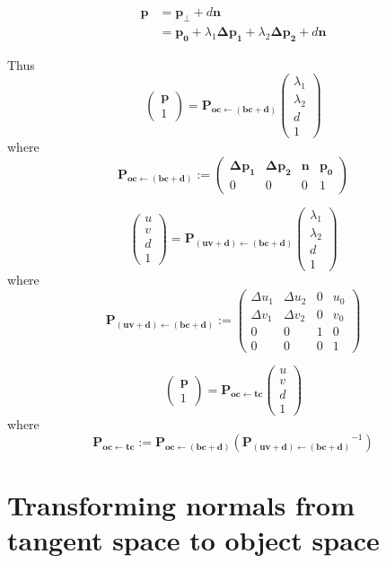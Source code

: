 \documentclass{article}
\newcommand{\vctr}[1]{\mathbf{#1}}
\newcommand{\point}[1]{\mathbf{#1}}
\newcommand{\mat}[1]{\mathbf{#1}}
\newcommand{\pMat}[2]{\mat{P_{#1 \leftarrow #2}}}
\newcommand{\colvec}[1]{\begin{pmatrix}#1\end{pmatrix}}
\begin{document}
\begin{align*}
 \point{p} &= \point{p_\perp} + d \vctr{n}\\
 &= \point{p_0} + \lambda_1 \point{\Delta p_1} + \lambda_2 \point{\Delta p_2} + d \vctr{n}
\end{align*}

Thus
\[
 \colvec{\point{p}\\1} = \pMat{oc}{(bc+d)} \colvec{\lambda_1 \\ \lambda_2 \\ d \\ 1}
\]
where
\begin{equation}
\label{eq:mat_oc_from_bdc}
 \pMat{oc}{(bc+d)} := \begin{pmatrix} 
                  \point{\Delta p_1} & \point{\Delta p_2} & \vctr{n} & \point{p_0} \\
                  0 & 0 & 0 & 1
                 \end{pmatrix}
\end{equation}

\[
 \colvec{u \\ v \\ d \\1} = \pMat{(uv+d)}{(bc+d)} \colvec{\lambda_1 \\ \lambda_2 \\ d \\ 1}
\]
where
\begin{equation}
 \pMat{(uv+d)}{(bc+d)} := \begin{pmatrix} 
                  \Delta u_1 & \Delta u_2 & 0 & u_0 \\
                  \Delta v_1 & \Delta v_2 & 0 & v_0 \\
                  0 & 0 & 1 & 0 \\
                  0 & 0 & 0 & 1
                 \end{pmatrix}
\end{equation}

\begin{equation*}
\colvec{\point{p}\\1} = \pMat{oc}{tc} \colvec{u \\ v \\ d \\ 1} 
\end{equation*}
where
\begin{equation*}
 \pMat{oc}{tc} := \pMat{oc}{(bc+d)}(\pMat{(uv+d)}{(bc+d)}^{-1}) 
\end{equation*}

\section{Transforming normals from tangent space to object space}
\end{document}
